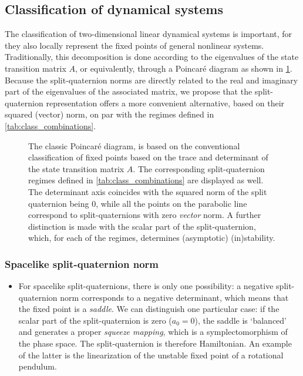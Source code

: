 \subsection{Classification of dynamical systems}
The classification of two-dimensional linear dynamical systems is important, for they also locally represent the fixed points of general nonlinear systems. Traditionally, this decomposition is done according to the eigenvalues of the state transition matrix \(A\), or equivalently, through a Poincaré diagram as shown in \cref{fig:poincare_diagram}. Because the split-quaternion norms are directly related to the real and imaginary part of the eigenvalues of the associated matrix, we propose that the split-quaternion representation offers a more convenient alternative, based on their squared (vector) norm, on par with the regimes defined in \cref{tab:class_combinations}.
\begin{figure}[ht!]
    \centering
    
    \caption{The classic Poincaré diagram, is based on the conventional classification of fixed points based on the trace and determinant of the state transition matrix \(A\). The corresponding split-quaternion regimes defined in \cref{tab:class_combinations} are displayed as well. The determinant axis coincides with the squared norm of the split quaternion being 0, while all the points on the parabolic line correspond to split-quaternions with zero \emph{vector} norm. A further distinction is made with the scalar part of the split-quaternion, which, for each of the regimes, determines (asymptotic) (in)stability.}
    \label{fig:poincare_diagram}
\end{figure}

\subsubsection*{Spacelike split-quaternion norm}
    \begin{itemize}
        \item[\circled{1}] For spacelike split-quaternions, there is only one possibility: a negative split-quaternion norm corresponds to a negative determinant, which means that the fixed point is a \emph{saddle}. We can distinguish one particular case: if the scalar part of the split-quaternion is zero (\(a_0 = 0\)), the saddle is `balanced' and generates a proper \emph{squeeze mapping}, which is a symplectomorphism of the phase space. The split-quaternion is therefore Hamiltonian. An example of the latter is the linearization of the unstable fixed point of a rotational pendulum.
    \end{itemize}

